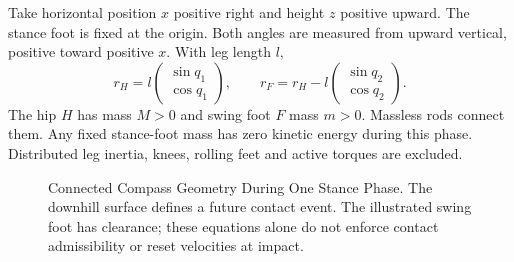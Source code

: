 Take horizontal position $x$ positive right and height $z$ positive upward.
The stance foot is fixed at the origin. Both angles are measured from upward
vertical, positive toward positive $x$. With leg length $l$,
\begin{equation}
 r_H=l\begin{pmatrix}\sin q_1\\\cos q_1\end{pmatrix},\qquad
 r_F=r_H-l\begin{pmatrix}\sin q_2\\\cos q_2\end{pmatrix}.
\end{equation}
The hip $H$ has mass $M>0$ and swing foot $F$ mass $m>0$. Massless rods
connect them. Any fixed stance-foot mass has zero kinetic energy during this
phase. Distributed leg inertia, knees, rolling feet and active torques are excluded.

\begin{figure}[htbp]
\centering
{}
\caption{Connected Compass Geometry During One Stance Phase. The downhill
surface defines a future contact event. The illustrated swing foot has
clearance; these equations alone do not enforce contact admissibility or reset
velocities at impact.}
\label{fig:ch7:passive-walker}
\end{figure}

